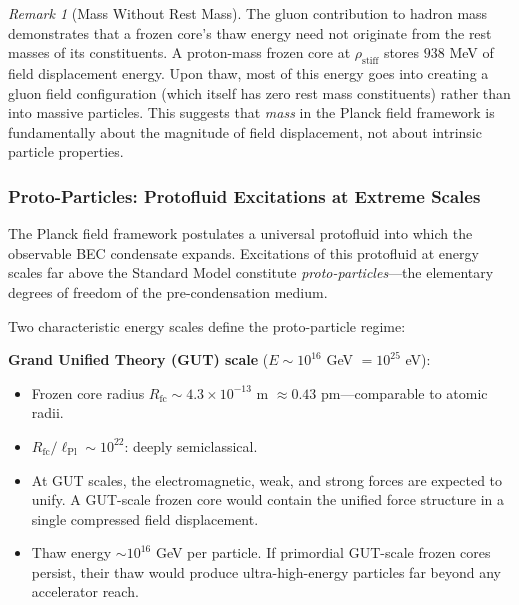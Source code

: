 \documentclass[11pt,a4paper]{article}
\newcommand{\lPl}{\ensuremath{\ell_{\mathrm{Pl}}}}
\newcommand{\rhostiff}{\ensuremath{\rho_{\mathrm{stiff}}}}
\newcommand{\Rfc}{\ensuremath{R_{\mathrm{fc}}}}
\theoremstyle{definition}
\theoremstyle{remark}
\newtheorem{remark}[theorem]{Remark}
\begin{document}
\begin{remark}[Mass Without Rest Mass]
\label{rem:gluon_mass}
The gluon contribution to hadron mass demonstrates that a frozen core's thaw energy need not originate from the rest masses of its constituents. A proton-mass frozen core at $\rhostiff$ stores $938$ MeV of field displacement energy. Upon thaw, most of this energy goes into creating a gluon field configuration (which itself has zero rest mass constituents) rather than into massive particles. This suggests that \emph{mass} in the Planck field framework is fundamentally about the magnitude of field displacement, not about intrinsic particle properties.
\end{remark}

\subsubsection{Proto-Particles: Protofluid Excitations at Extreme Scales}
\label{sec:proto_particles}

The Planck field framework postulates a universal protofluid into which the observable BEC condensate expands. Excitations of this protofluid at energy scales far above the Standard Model constitute \emph{proto-particles}---the elementary degrees of freedom of the pre-condensation medium.

\vspace{0.5em}
\noindent
Two characteristic energy scales define the proto-particle regime:

\textbf{Grand Unified Theory (GUT) scale} ($E \sim 10^{16}$ GeV $= 10^{25}$ eV):
\begin{itemize}[leftmargin=*, itemsep=0.2em]
\item Frozen core radius $\Rfc \sim 4.3 \times 10^{-13}$ m $\approx 0.43$ pm---comparable to atomic radii.
\item $\Rfc/\lPl \sim 10^{22}$: deeply semiclassical.
\item At GUT scales, the electromagnetic, weak, and strong forces are expected to unify. A GUT-scale frozen core would contain the unified force structure in a single compressed field displacement.
\item Thaw energy $\sim 10^{16}$ GeV per particle. If primordial GUT-scale frozen cores persist, their thaw would produce ultra-high-energy particles far beyond any accelerator reach.
\end{itemize}
\end{document}
